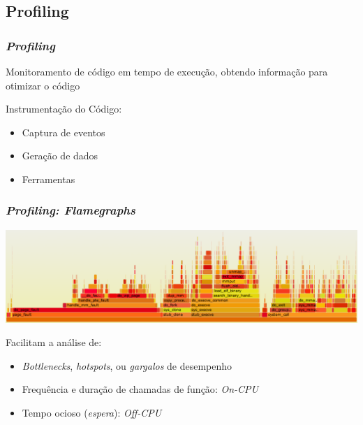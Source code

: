 \documentclass[10pt, compress]{beamer}
\begin{document}
\subsection{Profiling}

\begin{frame}
    \frametitle{\textit{Profiling}}
    Monitoramento de código \alert{em tempo de execução},
    obtendo informação para \alert{otimizar o código}
    \pause

    \alert{Instrumentação} do Código:
    \begin{itemize}
        \item Captura de \alert{eventos}
            \pause
        \item Geração de \alert{dados}
            \pause
        \item Ferramentas
    \end{itemize}
\end{frame}

\begin{frame}
    \frametitle{\textit{Profiling: Flamegraphs}}
    \begin{center}
        \includegraphics[width=\textwidth]{flamegraph}
    \end{center}

    Facilitam a análise de:
    \begin{itemize}
        \item \textit{Bottlenecks}, \textit{hotspots}, ou \textit{gargalos} de desempenho
            \pause
        \item Frequência e duração de \alert{chamadas de função}: \textit{On-CPU}
            \pause
        \item Tempo \alert{ocioso} (\textit{espera}): \textit{Off-CPU}
    \end{itemize}
\end{frame}
\end{document}
